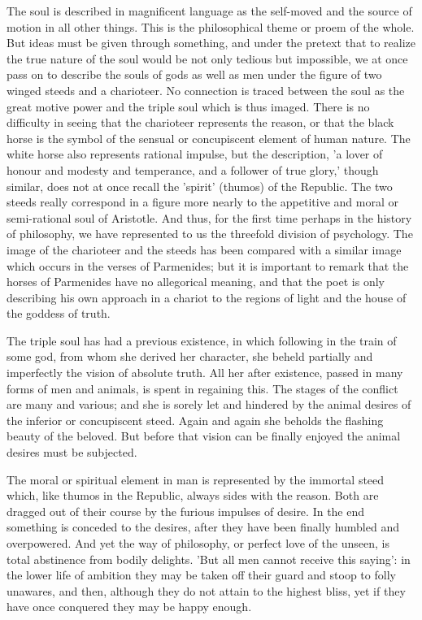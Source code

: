 \documentclass[11pt,letter]{article}
\begin{document}
\par  The soul is described in magnificent language as the self-moved and the source of motion in all other things. This is the philosophical theme or proem of the whole. But ideas must be given through something, and under the pretext that to realize the true nature of the soul would be not only tedious but impossible, we at once pass on to describe the souls of gods as well as men under the figure of two winged steeds and a charioteer. No connection is traced between the soul as the great motive power and the triple soul which is thus imaged. There is no difficulty in seeing that the charioteer represents the reason, or that the black horse is the symbol of the sensual or concupiscent element of human nature. The white horse also represents rational impulse, but the description, 'a lover of honour and modesty and temperance, and a follower of true glory,' though similar, does not at once recall the 'spirit' (thumos) of the Republic. The two steeds really correspond in a figure more nearly to the appetitive and moral or semi-rational soul of Aristotle. And thus, for the first time perhaps in the history of philosophy, we have represented to us the threefold division of psychology. The image of the charioteer and the steeds has been compared with a similar image which occurs in the verses of Parmenides; but it is important to remark that the horses of Parmenides have no allegorical meaning, and that the poet is only describing his own approach in a chariot to the regions of light and the house of the goddess of truth.

\par  The triple soul has had a previous existence, in which following in the train of some god, from whom she derived her character, she beheld partially and imperfectly the vision of absolute truth. All her after existence, passed in many forms of men and animals, is spent in regaining this. The stages of the conflict are many and various; and she is sorely let and hindered by the animal desires of the inferior or concupiscent steed. Again and again she beholds the flashing beauty of the beloved. But before that vision can be finally enjoyed the animal desires must be subjected.

\par  The moral or spiritual element in man is represented by the immortal steed which, like thumos in the Republic, always sides with the reason. Both are dragged out of their course by the furious impulses of desire. In the end something is conceded to the desires, after they have been finally humbled and overpowered. And yet the way of philosophy, or perfect love of the unseen, is total abstinence from bodily delights. 'But all men cannot receive this saying': in the lower life of ambition they may be taken off their guard and stoop to folly unawares, and then, although they do not attain to the highest bliss, yet if they have once conquered they may be happy enough.
\end{document}
